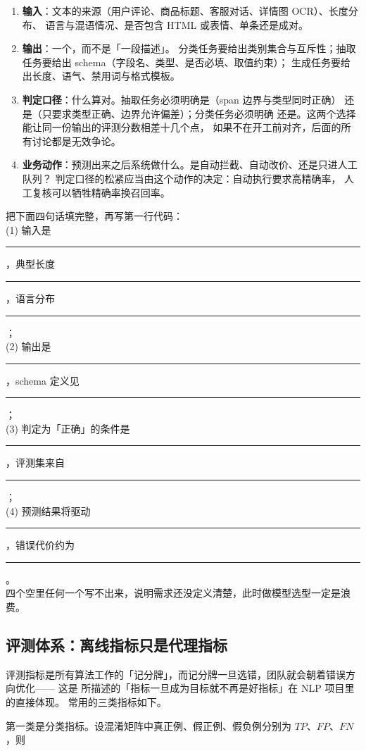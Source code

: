 \begin{enumerate}
  \item \textbf{输入}：文本的来源（用户评论、商品标题、客服对话、详情图 OCR）、长度分布、
        语言与混语情况、是否包含 HTML 或表情、单条还是成对。
  \item \textbf{输出}：一个，而不是「一段描述」。
        分类任务要给出类别集合与互斥性；抽取任务要给出 schema（字段名、类型、是否必填、取值约束）；
        生成任务要给出长度、语气、禁用词与格式模板。
  \item \textbf{判定口径}：什么算对。抽取任务必须明确是（span 边界与类型同时正确）
        还是（只要求类型正确、边界允许偏差）；分类任务必须明确
        还是。这两个选择能让同一份输出的评测分数相差十几个点，
        如果不在开工前对齐，后面的所有讨论都是无效争论。
  \item \textbf{业务动作}：预测出来之后系统做什么。是自动拦截、自动改价、还是只进人工队列？
        判定口径的松紧应当由这个动作的决定：自动执行要求高精确率，
        人工复核可以牺牲精确率换召回率。
\end{enumerate}

\begin{keypoint}[任务定义的四个必答问题]
把下面四句话填完整，再写第一行代码：\\
(1) 输入是\rule{1.6cm}{0.4pt}，典型长度\rule{1.2cm}{0.4pt}，语言分布\rule{1.6cm}{0.4pt}；\\
(2) 输出是\rule{1.6cm}{0.4pt}，schema 定义见\rule{1.6cm}{0.4pt}；\\
(3) 判定为「正确」的条件是\rule{2.4cm}{0.4pt}，评测集来自\rule{1.6cm}{0.4pt}；\\
(4) 预测结果将驱动\rule{1.8cm}{0.4pt}，错误代价约为\rule{1.6cm}{0.4pt}。\\
四个空里任何一个写不出来，说明需求还没定义清楚，此时做模型选型一定是浪费。
\end{keypoint}

\subsection{评测体系：离线指标只是代理指标}

评测指标是所有算法工作的「记分牌」，而记分牌一旦选错，团队就会朝着错误方向优化——
这是 \cite{goodhart1975} 所描述的「指标一旦成为目标就不再是好指标」在 NLP 项目里的直接体现。
常用的三类指标如下。

第一类是分类指标。设混淆矩阵中真正例、假正例、假负例分别为 $TP$、$FP$、$FN$，则

